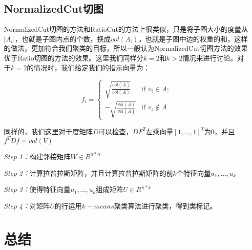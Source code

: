\documentclass[UTF8, 12pt]{ctexart}
\begin{document}
\subsection{NormalizedCut切图}
NormalizedCut切图的方法和RatioCut的方法上很类似，只是将子图大小的度量从$|{A_i}|$，也就是子图内点的个数，换成$vol(A_{i})$，也就是子图中边的权重的和，这样的做法，更加符合我们聚类的目标，所以一般认为NormalizedCut切图方法的效果优于Ratio切图的方法的效果。这里我们同样分$k=2$和$k>2$情况来进行讨论。对于$k=2$的情况时，我们给定我们的指示向量为：

\begin{equation}
{f_{i}} = \begin{cases}
\sqrt {\frac{{vol(\bar A)}}{{vol(A)}}} & \text{if } {v_i} \in A; \\
- \sqrt {\frac{{vol(A)}}{{vol(\bar A)}}} & \text{if } {v_i} \notin A
\end{cases}
\end{equation}

同样的，我们这里对于度矩阵$D$可以检查，${DF}^{T}$左乘向量${[1,...,1]^T}$为0，并且$f^{T}Df=vol(V)$

\emph{Step 1：}构建邻接矩阵$W \in {R^{n*n}}$

\emph{Step 2：}计算拉普拉斯矩阵，并且计算拉普拉斯矩阵的前$k$个特征向量${u_1},...,{u_k}$

\emph{Step 3：}使得特征向量${u_1},...,{u_k}$组成矩阵$U \in R^{n*k}$

\emph{Step 4：}对矩阵$U$的行运用$k-means$聚类算法进行聚类，得到类标记。

\section{总结}
\end{document}
